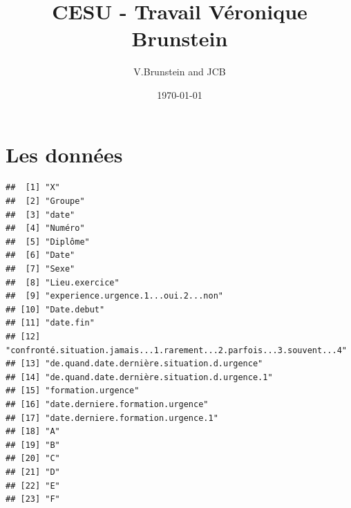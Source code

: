\documentclass[12pt,english,french]{article}\usepackage{graphicx, color}
\makeatletter
\newenvironment{kframe}{%
 \def\at@end@of@kframe{}%
 \ifinner\ifhmode%
  \def\at@end@of@kframe{\end{minipage}}%
  \begin{minipage}{\columnwidth}%
 \fi\fi%
 \def\FrameCommand##1{\hskip\@totalleftmargin \hskip-\fboxsep
 \colorbox{shadecolor}{##1}\hskip-\fboxsep
     \hskip-\linewidth \hskip-\@totalleftmargin \hskip\columnwidth}%
 \MakeFramed {\advance\hsize-\width
   \@totalleftmargin\z@ \linewidth\hsize
   \@setminipage}}%
 {\par\unskip\endMakeFramed%
 \at@end@of@kframe}
\newenvironment{knitrout}{}{} %
\makeatother
\begin{document}
\title{CESU - Travail Véronique Brunstein}
\author{V.Brunstein and JCB}
\date{\today}
\maketitle

\tableofcontents
\listoftables
\listoffigures

\section{Les données}

\begin{knitrout}
\color{fgcolor}\begin{kframe}
\begin{verbatim}
##  [1] "X"                                                                  
##  [2] "Groupe"                                                             
##  [3] "date"                                                               
##  [4] "Numéro"                                                             
##  [5] "Diplôme"                                                            
##  [6] "Date"                                                               
##  [7] "Sexe"                                                               
##  [8] "Lieu.exercice"                                                      
##  [9] "experience.urgence.1...oui.2...non"                                 
## [10] "Date.debut"                                                         
## [11] "date.fin"                                                           
## [12] "confronté.situation.jamais...1.rarement...2.parfois...3.souvent...4"
## [13] "de.quand.date.dernière.situation.d.urgence"                         
## [14] "de.quand.date.dernière.situation.d.urgence.1"                       
## [15] "formation.urgence"                                                  
## [16] "date.derniere.formation.urgence"                                    
## [17] "date.derniere.formation.urgence.1"                                  
## [18] "A"                                                                  
## [19] "B"                                                                  
## [20] "C"                                                                  
## [21] "D"                                                                  
## [22] "E"                                                                  
## [23] "F"                                                                  

\end{verbatim}
\end{kframe}
\end{knitrout}
\end{document}

